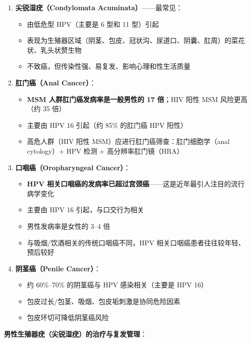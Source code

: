 \begin{enumerate}
	\item \textbf{尖锐湿疣（Condylomata Acuminata）}——最常见：
	\begin{itemize}
		\item 由低危型 HPV（主要是 6 型和 11 型）引起
		\item 表现为生殖器区域（阴茎、包皮、冠状沟、尿道口、阴囊、肛周）的菜花状、乳头状赘生物
		\item 不致癌，但传染性强、易复发、影响心理和性生活质量
	\end{itemize}

	\item \textbf{肛门癌（Anal Cancer）}：
	\begin{itemize}
		\item \textbf{MSM 人群肛门癌发病率是一般男性的 17 倍}；HIV 阳性 MSM 风险更高（约 35 倍）
		\item 主要由 HPV 16 引起（约 85\% 的肛门癌 HPV 阳性）
		\item 高危人群（HIV 阳性 MSM）应进行肛门癌筛查：肛门细胞学（anal cytology）+ HPV 检测 + 高分辨率肛门镜（HRA）
	\end{itemize}

	\item \textbf{口咽癌（Oropharyngeal Cancer）}：
	\begin{itemize}
		\item \textbf{HPV 相关口咽癌的发病率已超过宫颈癌}——这是近年最引人注目的流行病学变化
		\item 主要由 HPV 16 引起，与口交行为相关
		\item 男性发病率是女性的 3--4 倍
		\item 与吸烟/饮酒相关的传统口咽癌不同，HPV 相关口咽癌患者往往较年轻、预后较好
	\end{itemize}

	\item \textbf{阴茎癌（Penile Cancer）}：
	\begin{itemize}
		\item 约 60\%--70\% 的阴茎癌与 HPV 感染相关（主要是 HPV 16）
		\item 包皮过长/包茎、吸烟、包皮垢刺激是协同危险因素
		\item 包皮环切可降低阴茎癌风险
	\end{itemize}
\end{enumerate}

\vspace{0.5em}
\noindent\textbf{男性生殖器疣（尖锐湿疣）的治疗与复发管理}：


